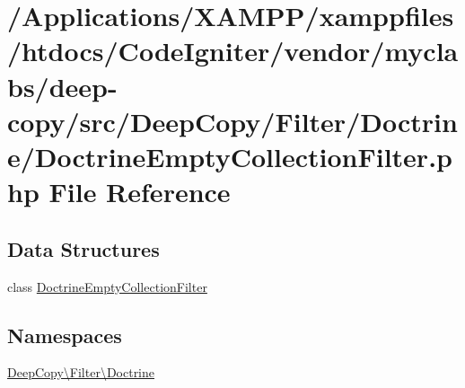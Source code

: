 \hypertarget{_doctrine_empty_collection_filter_8php}{}\section{/\+Applications/\+X\+A\+M\+P\+P/xamppfiles/htdocs/\+Code\+Igniter/vendor/myclabs/deep-\/copy/src/\+Deep\+Copy/\+Filter/\+Doctrine/\+Doctrine\+Empty\+Collection\+Filter.php File Reference}
\label{_doctrine_empty_collection_filter_8php}
\subsection*{Data Structures}
\begin{DoxyCompactItemize}
\item 
class \mbox{\hyperlink{class_deep_copy_1_1_filter_1_1_doctrine_1_1_doctrine_empty_collection_filter}{Doctrine\+Empty\+Collection\+Filter}}
\end{DoxyCompactItemize}
\subsection*{Namespaces}
\begin{DoxyCompactItemize}
\item 
 \mbox{\hyperlink{namespace_deep_copy_1_1_filter_1_1_doctrine}{Deep\+Copy\textbackslash{}\+Filter\textbackslash{}\+Doctrine}}
\end{DoxyCompactItemize}
